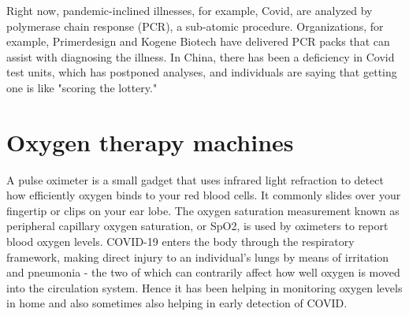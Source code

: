 \documentclass[12pt]{article}
\begin{document}
Right now, pandemic-inclined illnesses, for example, Covid, are analyzed by polymerase chain response (PCR), a sub-atomic procedure. Organizations, for example, Primerdesign and Kogene Biotech have delivered PCR packs that can assist with diagnosing the illness. In China, there has been a deficiency in Covid test units, which has postponed analyses, and individuals are saying that getting one is like "scoring the lottery."


\section{Oxygen therapy machines}

A pulse oximeter is a small gadget that uses infrared light refraction to detect how efficiently oxygen binds to your red blood cells. It commonly slides over your fingertip or clips on your ear lobe. The oxygen saturation measurement known as peripheral capillary oxygen saturation, or SpO2, is used by oximeters to report blood oxygen levels. COVID-19 enters the body through the respiratory framework, making direct injury to an individual's lungs by means of irritation and pneumonia - the two of which can contrarily affect how well oxygen is moved into the circulation system. Hence it has been helping in monitoring oxygen levels in home and also sometimes also helping in early detection of COVID.
\end{document}
